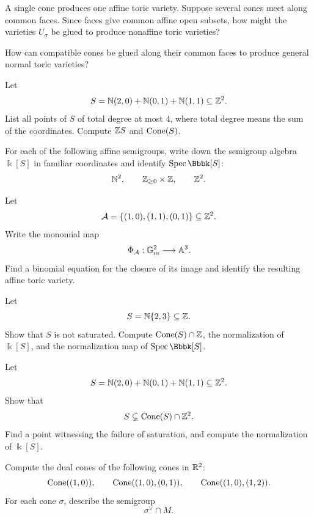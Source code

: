 \begin{prediction}
A single cone produces one affine toric variety. Suppose several cones
meet along common faces. Since faces give common affine open subsets,
how might the varieties \(U_\sigma\) be glued to produce nonaffine
toric varieties?
\end{prediction}

\begin{guidingquestion}
How can compatible cones be glued along their common faces to produce
general normal toric varieties?
\end{guidingquestion}

\clearpage

\begin{exercises}

\item Let
\[
S=\mathbb{N}(2,0)+\mathbb{N}(0,1)+\mathbb{N}(1,1)\subseteq\mathbb{Z}^2.
\]
List all points of \(S\) of total degree at most \(4\), where total
degree means the sum of the coordinates. Compute \(\mathbb{Z} S\) and
\(\operatorname{Cone}(S)\).

\item For each of the following affine semigroups, write down the
semigroup algebra \(\Bbbk[S]\) in familiar coordinates and identify
\(\Spec\Bbbk[S]\):
\[
\mathbb{N}^2,\qquad
\mathbb{Z}_{\geq0}\times\mathbb{Z},\qquad
\mathbb{Z}^2.
\]

\item Let
\[
\mathcal A=\{(1,0),(1,1),(0,1)\}\subseteq\mathbb{Z}^2.
\]
Write the monomial map
\[
\Phi_{\mathcal A}:\mathbb{G}_{m}^2\longrightarrow\mathbb{A}^3.
\]
Find a binomial equation for the closure of its image and identify the
resulting affine toric variety.

\item Let
\[
S=\mathbb{N}\{2,3\}\subseteq\mathbb{Z}.
\]
Show that \(S\) is not saturated. Compute \(\operatorname{Cone}(S)\cap\mathbb{Z}\), the
normalization of \(\Bbbk[S]\), and the normalization map of
\(\Spec\Bbbk[S]\).

\item Let
\[
S=\mathbb{N}(2,0)+\mathbb{N}(0,1)+\mathbb{N}(1,1)\subseteq\mathbb{Z}^2.
\]
Show that
\[
S\subsetneq\operatorname{Cone}(S)\cap\mathbb{Z}^2.
\]
Find a point witnessing the failure of saturation, and compute the
normalization of \(\Bbbk[S]\).

\item Compute the dual cones of the following cones in \(\mathbb{R}^2\):
\[
\operatorname{Cone}((1,0)),\qquad
\operatorname{Cone}((1,0),(0,1)),\qquad
\operatorname{Cone}((1,0),(1,2)).
\]
For each cone \(\sigma\), describe the semigroup
\[
\sigma^\vee\cap M.
\]


\end{exercises}
